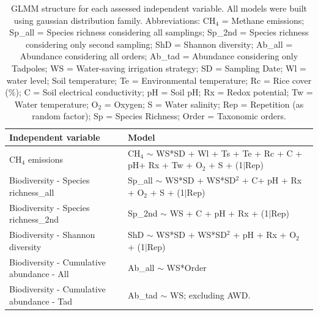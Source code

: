 \begin{table}[htbp]
    \scriptsize %
    \renewcommand{\arraystretch}{0.9} %
    \centering
\begin{tabularx}{\textwidth}{l X}
    \toprule
Independent variable & Model\\
       \midrule 
    CH$_{4}$ emissions & CH$_{4}$ $\sim$ WS*SD + Wl + Ts + Te + Rc + C + pH+ Rx + Tw + O$_{2}$ + S + (1$\mid$Rep) \\
    Biodiversity - Species richness\_all & Sp\_all $\sim$ WS*SD + WS*SD$^2$ + C+ pH + Rx + O$_{2}$ + S + (1$\mid$Rep) \\
    Biodiversity - Species richness\_2nd & Sp\_2nd $\sim$ WS + C + pH + Rx + (1$\mid$Rep) \\
    Biodiversity - Shannon diversity & ShD $\sim$ WS*SD + WS*SD$^2$ + pH + Rx + O$_{2}$ + (1$\mid$Rep) \\
    Biodiversity - Cumulative abundance - All & Ab\_all $\sim$ WS*Order \\
    Biodiversity - Cumulative abundance - Tad & Ab\_tad $\sim$ WS; excluding AWD. \\
    \bottomrule
\end{tabularx}
    \caption[GLMM structures]{GLMM structure for each assessed independent variable. All models were built using gaussian distribution family. Abbreviations: CH$_{4}$ = Methane emissions; Sp\_all = Species richness considering all samplings; Sp\_2nd = Species richness considering only second sampling; ShD = Shannon diversity; Ab\_all = Abundance considering all orders; Ab\_tad = Abundance considering only Tadpoles; WS = Water-saving irrigation strategy; SD = Sampling Date; Wl = water level; Soil temperature; Te = Environmental temperature; Rc = Rice cover (\%); C = Soil electrical conductivity; pH = Soil pH; Rx = Redox potential; Tw = Water temperature; O$_{2}$ = Oxygen; S = Water salinity; Rep = Repetition (as random factor); Sp = Species Richness;  Order = Taxonomic orders.}
    \label{mod_str}
\end{table}


